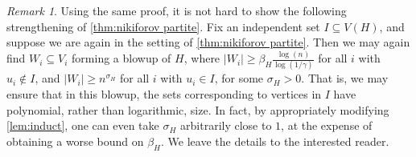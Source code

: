 \documentclass{aic}
\theoremstyle{plain}
\theoremstyle{remark}
\newtheorem*{remark}{Remark}
\newcommand\ab[1]{\lvert #1 \rvert}
\begin{document}
\begin{remark}
    Using the same proof, it is not hard to show the following strengthening of \cref{thm:nikiforov partite}. Fix an independent set $I \subseteq V(H)$, and suppose we are again in the setting of \cref{thm:nikiforov partite}. Then we may again find $W_i \subseteq V_i$ forming a blowup of $H$, where $\ab{W_i} \geq \beta_H \frac{\log(n)}{\log(1/\gamma)}$ for all $i$ with $u_i \notin I$, and $\ab{W_i}\geq n^{\sigma_H}$ for all $i$ with $u_i \in I$, for some $\sigma_H>0$. That is, we may ensure that in this blowup, the sets corresponding to vertices in $I$ have polynomial, rather than logarithmic, size. In fact, by appropriately modifying \cref{lem:induct}, one can even take $\sigma_H$ arbitrarily close to $1$, at the expense of obtaining a worse bound on $\beta_H$. We leave the details to the interested reader.
\end{remark}
\end{document}
